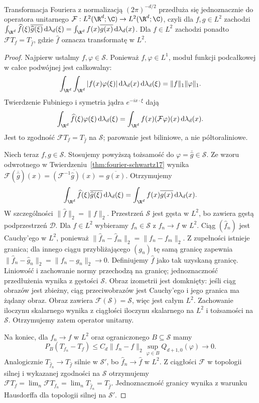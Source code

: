 \begin{twierdzenie}
\label{thm:plancherel22}
Transformacja Fouriera z normalizacją $(2\pi)^{-d/2}$
przedłuża się jednoznacznie do operatora unitarnego
$\mathcal F:L^2(\R^d;\C)\to L^2(\R^d;\C)$,
czyli dla $f,g\in L^2$ zachodzi
$\int_{\R^d}\widehat f(\xi)\overline{\widehat g(\xi)}
\,\mathrm d\lambda_d(\xi)
=\int_{\R^d}f(x)\overline{g(x)}\,\mathrm d\lambda_d(x)$.
Dla $f\in L^2$ zachodzi ponadto
$\mathcal F T_f=T_{\widehat f}$, gdzie $\widehat f$
oznacza transformatę w $L^2$.
\end{twierdzenie}
\begin{proof}
Najpierw ustalmy $f,\varphi\in\mathcal S$.
Ponieważ $f,\varphi\in L^1$, moduł funkcji
podcałkowej w całce podwójnej jest całkowalny:
\[
 \int_{\R^d}\int_{\R^d}|f(x)\varphi(\xi)|
 \,\mathrm d\lambda_d(x)\,\mathrm d\lambda_d(\xi)
 =\|f\|_1\|\varphi\|_1.
\]
Twierdzenie Fubiniego i symetria jądra
$e^{-ix\cdot\xi}$ dają
\[
 \int_{\R^d}\widehat f(\xi)\varphi(\xi)
 \,\mathrm d\lambda_d(\xi)
 =\int_{\R^d}f(x)(\mathcal F\varphi)(x)
 \,\mathrm d\lambda_d(x).
\]
Jest to zgodność $\mathcal F T_f=T_{\widehat f}$ na
$\mathcal S$; parowanie jest biliniowe, a nie
półtoraliniowe.

Niech teraz $f,g\in\mathcal S$. Stosujemy powyższą
tożsamość do $\varphi=\overline{\widehat g}\in\mathcal S$.
Ze wzoru odwrotnego w Twierdzeniu~\ref{thm:fourier-schwartz17}
wynika
$\mathcal F(\overline{\widehat g})(x)
=\overline{(\mathcal F^{-1}\widehat g)(x)}
=\overline{g(x)}$.
Otrzymujemy
\[
 \int_{\R^d}\widehat f(\xi)\overline{\widehat g(\xi)}
 \,\mathrm d\lambda_d(\xi)
 =\int_{\R^d}f(x)\overline{g(x)}\,\mathrm d\lambda_d(x).
\]
W szczególności $\|\widehat f\|_2=\|f\|_2$.
Przestrzeń $\mathcal S$ jest gęsta w $L^2$, bo zawiera
gęstą podprzestrzeń $\mathcal D$. Dla $f\in L^2$
wybieramy $f_n\in\mathcal S$ z $f_n\to f$ w $L^2$.
Ciąg $(\widehat f_n)$ jest Cauchy'ego w $L^2$,
ponieważ $\|\widehat f_n-\widehat f_m\|_2
=\|f_n-f_m\|_2$. Z zupełności istnieje granica;
dla innego ciągu przybliżającego $(g_n)$ tę samą granicę
zapewnia $\|\widehat f_n-\widehat g_n\|_2
=\|f_n-g_n\|_2\to0$. Definiujemy $\widehat f$ jako
tak uzyskaną granicę. Liniowość i zachowanie normy
przechodzą na granicę; jednoznaczność przedłużenia
wynika z gęstości $\mathcal S$.
Obraz izometrii jest domknięty: jeśli ciąg obrazów
jest zbieżny, ciąg przeciwobrazów jest Cauchy'ego i
jego granica ma żądany obraz. Obraz zawiera
$\mathcal F(\mathcal S)=\mathcal S$, więc jest całym
$L^2$. Zachowanie iloczynu skalarnego wynika z ciągłości
iloczynu skalarnego na $L^2$ i tożsamości na $\mathcal S$.
Otrzymujemy zatem operator unitarny.

Na koniec, dla $f_n\to f$ w $L^2$ oraz ograniczonego
$B\subseteq\mathcal S$ mamy
\[
 P_B(T_{f_n}-T_f)
 \le C_d\|f_n-f\|_2
 \sup_{\varphi\in B}Q_{d+1,0}(\varphi)\longrightarrow0.
\]
Analogicznie $T_{\widehat f_n}\to T_{\widehat f}$ silnie
w $\mathcal S'$, bo $\widehat f_n\to\widehat f$ w $L^2$.
Z ciągłości $\mathcal F$ w topologii silnej i
wykazanej zgodności na $\mathcal S$ otrzymujemy
$\mathcal FT_f=\lim_n\mathcal FT_{f_n}
=\lim_nT_{\widehat f_n}=T_{\widehat f}$.
Jednoznaczność granicy wynika z warunku Hausdorffa
dla topologii silnej na $\mathcal S'$.
\end{proof}

